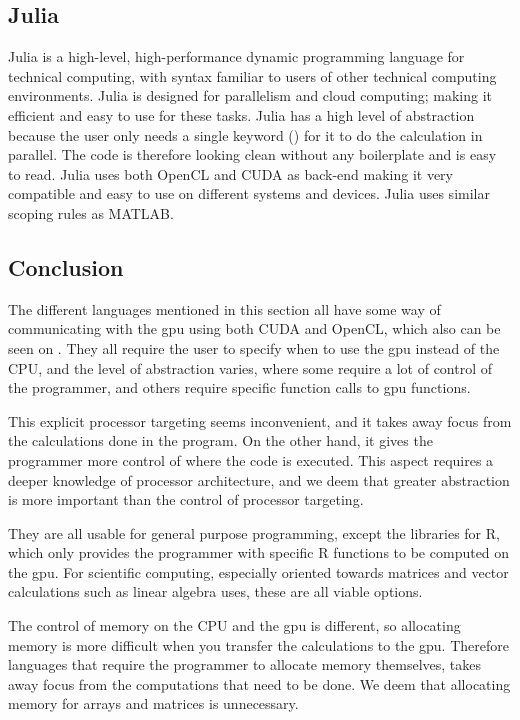 \subsection{Julia}
Julia is a high-level, high-performance dynamic programming language for technical computing, with syntax familiar to users of other technical computing environments.
Julia is designed for parallelism and cloud computing; making it efficient and easy to use for these tasks.
Julia has a high level of abstraction because the user only needs a single keyword (\@parallel) for it to do the calculation in parallel.
The code is therefore looking clean without any boilerplate and is easy to read.
Julia uses both OpenCL and CUDA as back-end making it very compatible and easy to use on different systems and devices.
Julia uses similar scoping rules as MATLAB.\citep{Julia_Git, Julia_scope,Julia}

 

\subsection{Conclusion}  

The different languages mentioned in this section all have some way of communicating with the \acrshort{gpu} using both CUDA and OpenCL, which also can be seen on  .
They all require the user to specify when to use the \acrshort{gpu} instead of the CPU, and the level of abstraction varies, where some require a lot of control of the programmer, and others require specific function calls to \acrshort{gpu} functions.

This explicit processor targeting seems inconvenient, and it takes away focus from the calculations done in the program.
On the other hand, it gives the programmer more control of where the code is executed.
This aspect requires a deeper knowledge of processor architecture, and we deem that greater abstraction is more important than the control of processor targeting.

They are all usable for general purpose programming, except the libraries for R, which only provides the programmer with specific R functions to be computed on the \acrshort{gpu}.
For scientific computing, especially oriented towards matrices and vector calculations such as linear algebra uses, these are all viable options.

The control of memory on the CPU and the \acrshort{gpu} is different, so allocating memory is more difficult when you transfer the calculations to the \acrshort{gpu}.
Therefore languages that require the programmer to allocate memory themselves, takes away focus from the computations that need to be done.
We deem that allocating memory for arrays and matrices is unnecessary.
                     
